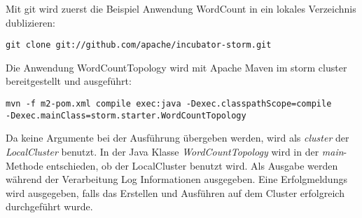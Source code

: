 Mit git wird zuerst die Beispiel Anwendung WordCount in ein lokales Verzeichnis dublizieren:

\begin{verbatim}
git clone git://github.com/apache/incubator-storm.git
\end{verbatim}

Die Anwendung WordCountTopology wird mit Apache Maven im storm cluster bereitgestellt und ausgeführt:

\begin{verbatim}
mvn -f m2-pom.xml compile exec:java -Dexec.classpathScope=compile 
-Dexec.mainClass=storm.starter.WordCountTopology
\end{verbatim}

Da keine Argumente bei der Ausführung übergeben werden, wird als \textit{cluster} der \textit{LocalCluster} benutzt. In der Java Klasse \textit{WordCountTopology} wird in der \textit{main}-Methode entschieden, ob der LocalCluster benutzt wird. Als Ausgabe werden während der Verarbeitung Log Informationen ausgegeben. Eine Erfolgmeldungs wird ausgegeben, falls das Erstellen und Ausführen auf dem Cluster erfolgreich durchgeführt wurde.

